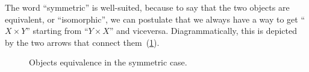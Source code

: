 The word ``symmetric'' is well-suited, because to say that the two objects are equivalent, or ``isomorphic'', we can postulate that we always have a way to get
``$X \times Y$'' starting from ``$Y \times X$'' and viceversa.
Diagrammatically, this is depicted by the two arrows that connect them~(\cref{fig:e17}).

\begin{figure}[h!]
    \centering
    \caption{Objects equivalence in the symmetric case. }
    \label{fig:e17}
\end{figure}

